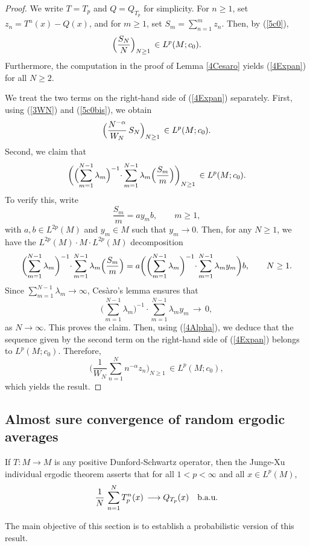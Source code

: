\documentclass[12pt]{amsart}
\theoremstyle{remark}
\theoremstyle{definition}
\numberwithin{equation}{section}
\begin{document}
\begin{proof} 
We write $T=T_p$ and $Q=Q_{T_p}$ for simplicity.
For $n\geq 1$, set $z_n = T^n(x) - Q(x)$, and for $m\geq 1$, set
$S_m = \sum_{n=1}^m z_n$. Then, by (\ref{5c0}),
\begin{equation}\label{5c0bis}
\Bigl(\frac{S_N}{N}\Bigr)_{N\geq 1}\,\in L^p(M;c_0).
\end{equation}
Furthermore, the computation in the proof of
Lemma \ref{4Cesaro} yields (\ref{4Expan}) for all 
$N\geq 2$.

We treat the two terms on the right-hand side of (\ref{4Expan}) separately.
First, using (\ref{3WN}) and (\ref{5c0bis}), we obtain
$$
\Bigl(\frac{N^{-\alpha}}{W_N}\, S_N \Bigr)_{N\geq 1}\,\in L^p(M;c_0).
$$
Second, we claim that
$$
\biggl(\Bigl(\sum_{m=1}^{N-1}\lambda_m\Bigr)^{-1}\cdotp \sum_{m=1}^{N-1}
\lambda_m\Bigl(\frac{S_m}{m}\Bigr)\biggr)_{N\geq 1}\, \in L^p(M;c_0).
$$
To verify this, write
$$
\frac{S_m}{m} = ay_mb,\qquad m\geq 1,
$$
with $a,b\in L^{2p}(M)$ and $y_m\in M$ such that $y_m\to 0$.
Then, for any $N\geq 1$, we have the $L^{2p}(M)\cdotp M\cdotp L^{2p}(M)$ decomposition
$$
\biggl(\sum_{m=1}^{N-1}\lambda_m\biggr)^{-1}\cdotp \sum_{m=1}^{N-1}
\lambda_m\Bigl(\frac{S_m}{m}\Bigr)
= a\biggl(\biggl(\sum_{m=1}^{N-1}\lambda_m\biggr)^{-1}
\cdotp \sum_{m=1}^{N-1} \lambda_m y_m\biggr)b,
\qquad N\geq 1.
$$
Since $\sum_{m=1}^{N-1}\lambda_m\to\infty$, Cesàro's lemma ensures that
$$
\biggl(\sum_{m=1}^{N-1}\lambda_m\biggr)^{-1}\cdotp \sum_{m=1}^{N-1}
\lambda_m y_m
\,\longrightarrow\, 0,
$$
as $N\to \infty$. This proves the claim. Then, using (\ref{4Alpha}), we deduce that the sequence given by the
second term on the right-hand side of (\ref{4Expan}) belongs to $L^p(M;c_0)$. Therefore,
$$
\biggl(\frac{1}{W_N}\sum_{n=1}^N n^{-\alpha} z_n\biggr)_{N\geq 1}
\,\in L^p(M;c_0),
$$
which yields the result.
\end{proof}



\subsection{Almost sure convergence of random ergodic averages}

If $T\colon M\to M$ is any
positive Dunford-Schwartz operator, then the Junge-Xu individual ergodic theorem \cite[Corollary 6.4]{JX} asserts that for all $1<p<\infty$ and all $x\in L^p(M)$, 
$$
\frac{1}{N}\,\sum_{n=1}^N T_p^n(x)\,\longrightarrow Q_{T_p}(x)\quad\hbox{b.a.u.}
$$

The main objective of this section is to establish a probabilistic version of this result.
\end{document}

